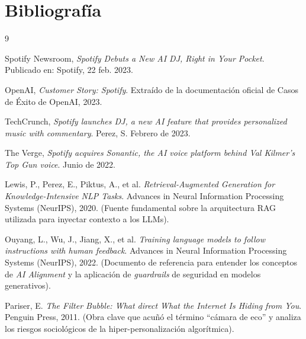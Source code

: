 \documentclass[12pt,a4paper]{article}
\begin{document}
\newpage


\section{Bibliografía}
\begin{thebibliography}{9}

Spotify Newsroom, 
\textit{Spotify Debuts a New AI DJ, Right in Your Pocket}. 
Publicado en: Spotify, 22 feb. 2023.

OpenAI, 
\textit{Customer Story: Spotify}. 
Extraído de la documentación oficial de Casos de Éxito de OpenAI, 2023.

TechCrunch, 
\textit{Spotify launches DJ, a new AI feature that provides personalized music with commentary}.
Perez, S. Febrero de 2023.

The Verge, 
\textit{Spotify acquires Sonantic, the AI voice platform behind Val Kilmer’s Top Gun voice}.
Junio de 2022.

Lewis, P., Perez, E., Piktus, A., et al.
\textit{Retrieval-Augmented Generation for Knowledge-Intensive NLP Tasks}.
Advances in Neural Information Processing Systems (NeurIPS), 2020. 
(Fuente fundamental sobre la arquitectura RAG utilizada para inyectar contexto a los LLMs).

Ouyang, L., Wu, J., Jiang, X., et al.
\textit{Training language models to follow instructions with human feedback}.
Advances in Neural Information Processing Systems (NeurIPS), 2022.
(Documento de referencia para entender los conceptos de \textit{AI Alignment} y la aplicación de \textit{guardrails} de seguridad en modelos generativos).

Pariser, E.
\textit{The Filter Bubble: What direct What the Internet Is Hiding from You}.
Penguin Press, 2011.
(Obra clave que acuñó el término ``cámara de eco'' y analiza los riesgos sociológicos de la hiper-personalización algorítmica).

\end{thebibliography}
\end{document}
